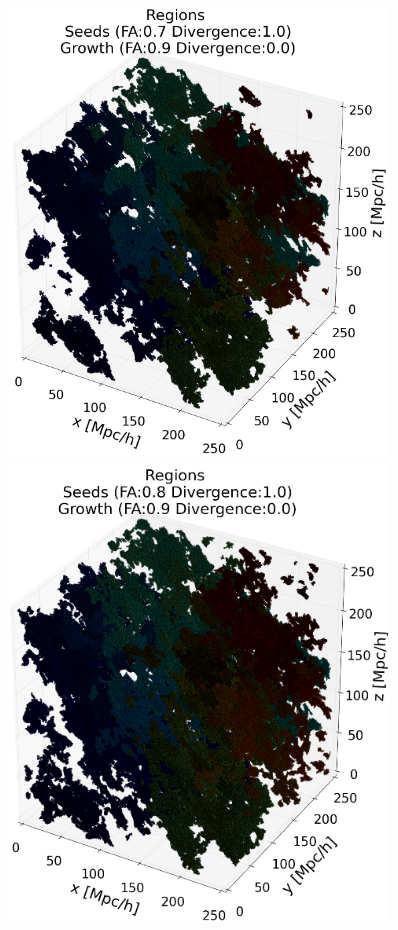 \documentclass[12pt]{article}
\begin{document}
\begin{figure}[ht]
\begin{minipage}{.45\textwidth}
\end{minipage}
\begin{minipage}{.45\textwidth}
  \centering
  \includegraphics[width=0.9\textwidth]{groups/3d/seeds_FA_7/regions_nonoise_seeds_FA_07_Trace_10_search_FA_09_Trace_00_.png}
\end{minipage}
\begin{minipage}{.45\textwidth}
  \centering
  \includegraphics[width=0.9\textwidth]{groups/3d/seeds_FA_8/regions_nonoise_seeds_FA_08_Trace_10_search_FA_09_Trace_00_.png}

\end{minipage}
\end{figure}
\end{document}
